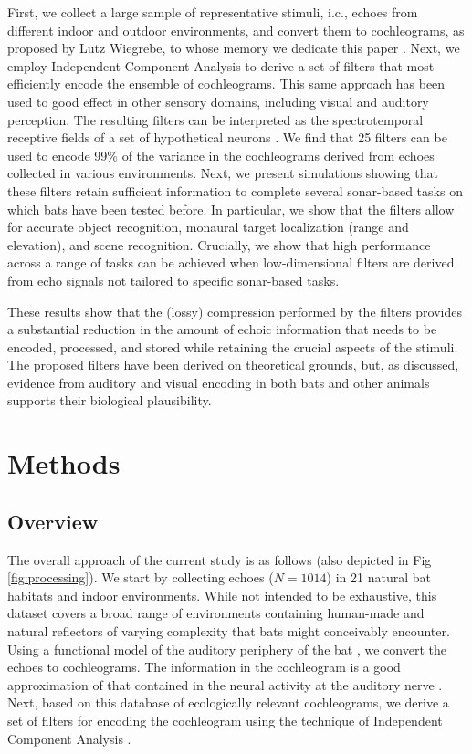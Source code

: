 \documentclass[10pt,letterpaper]{article}
\begin{document}
First, we collect a large sample of representative stimuli, i.c., echoes from different indoor and outdoor environments, and convert them to cochleograms, as proposed by Lutz Wiegrebe, to whose memory we dedicate this paper \cite{Wiegrebe2008}. Next, we employ Independent Component Analysis to derive a set of filters that most efficiently encode the ensemble of cochleograms. This same approach has been used to good effect in other sensory domains, including visual \cite{Olshausen1996} and auditory \cite{Lewicki2002} perception. The resulting filters can be interpreted as the spectrotemporal receptive fields of a set of hypothetical neurons \cite{Mely2017}. We find that 25 filters can be used to encode  99\% of the variance in the cochleograms derived from echoes collected in various environments. Next, we present simulations showing that these filters retain sufficient information to complete several sonar-based tasks on which bats have been tested before. In particular, we show that the filters allow for accurate object recognition, monaural target localization (range and elevation), and scene recognition. Crucially, we show that high performance across a range of tasks can be achieved when low-dimensional filters are derived from echo signals not tailored to specific sonar-based tasks.

These results show that the (lossy) compression performed by the filters provides a substantial reduction in the amount of echoic information that needs to be encoded, processed, and stored while retaining the crucial aspects of the stimuli. The proposed filters have been derived on theoretical grounds, but, as discussed, evidence from auditory and visual encoding in both bats and other animals supports their biological plausibility. 

\section*{Methods}

\subsection*{Overview}

The overall approach of the current study is as follows (also depicted in Fig \ref{fig:processing}). We start by collecting echoes ($N=1014$) in 21 natural bat habitats and indoor environments. While not intended to be exhaustive, this dataset covers a broad range of environments containing human-made and natural reflectors of varying complexity that bats might conceivably encounter. Using a functional model of the auditory periphery of the bat \cite{Wiegrebe2008}, we convert the echoes to cochleograms. The information in the cochleogram is a good approximation of that contained in the neural activity at the auditory nerve \cite{Reijniers2010a}. Next, based on this database of ecologically relevant cochleograms, we derive a set of filters for encoding the cochleogram using the technique of Independent Component Analysis \cite{Hyvarinen2001}.
\end{document}
